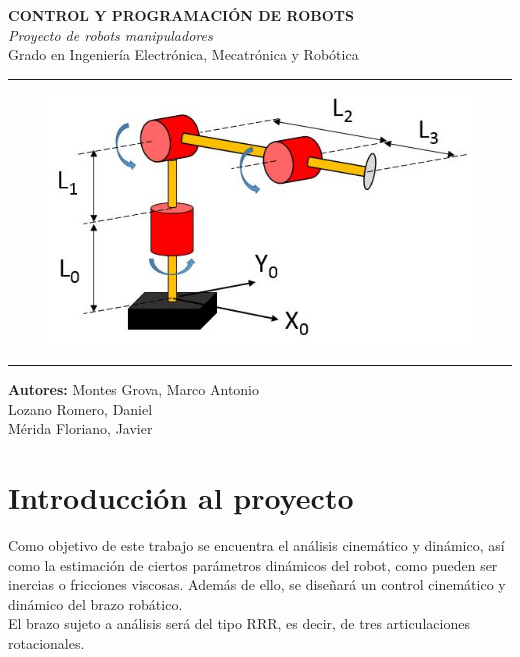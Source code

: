 \documentclass[a4paper,twoside]{article}
\begin{document}
\begin{titlepage}
	\centering
\Huge{\textbf{CONTROL Y PROGRAMACIÓN DE ROBOTS}} \\
\Huge{\textit{Proyecto de robots manipuladores}}\\

\vspace{1cm}
\LARGE{Grado en Ingeniería Electrónica, Mecatrónica y Robótica}\\
\rule{\textwidth}{0.1mm}
\begin{figure}[h!]
	\centering
	\includegraphics[width=1\textwidth]{brazo_portada}
\end{figure}
\vspace{3cm}
\rule{\textwidth}{0.1mm}
\Large{\textbf{Autores:} Montes Grova, Marco Antonio\\
 Lozano Romero, Daniel\\
 Mérida Floriano, Javier}
\end{titlepage}
\tableofcontents
\newpage
\section{Introducción al proyecto}
	Como objetivo de este trabajo se encuentra el análisis cinemático y dinámico, así como la estimación de ciertos parámetros dinámicos del robot, como pueden ser inercias o fricciones viscosas. Además de ello, se diseñará un control cinemático y dinámico del brazo robático.\\
	El brazo sujeto a análisis será del tipo RRR, es decir, de tres articulaciones rotacionales.
	
\end{document}
